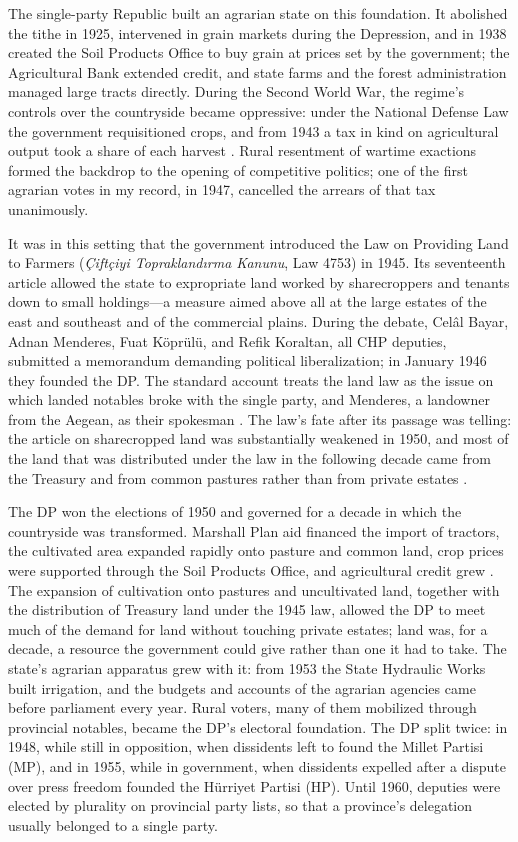 \documentclass[12pt]{article}
\begin{document}
The single-party Republic built an agrarian state on this foundation. It abolished the tithe in 1925, intervened in grain markets during the Depression, and in 1938 created the Soil Products Office to buy grain at prices set by the government; the Agricultural Bank extended credit, and state farms and the forest administration managed large tracts directly. During the Second World War, the regime's controls over the countryside became oppressive: under the National Defense Law the government requisitioned crops, and from 1943 a tax in kind on agricultural output took a share of each harvest \citep{keyder1987,zurcher2004}. Rural resentment of wartime exactions formed the backdrop to the opening of competitive politics; one of the first agrarian votes in my record, in 1947, cancelled the arrears of that tax unanimously.

It was in this setting that the government introduced the Law on Providing Land to Farmers (\textit{Çiftçiyi Topraklandırma Kanunu}, Law 4753) in 1945. Its seventeenth article allowed the state to expropriate land worked by sharecroppers and tenants down to small holdings---a measure aimed above all at the large estates of the east and southeast and of the commercial plains. During the debate, Celâl Bayar, Adnan Menderes, Fuat Köprülü, and Refik Koraltan, all CHP deputies, submitted a memorandum demanding political liberalization; in January 1946 they founded the DP. The standard account treats the land law as the issue on which landed notables broke with the single party, and Menderes, a landowner from the Aegean, as their spokesman \citep{karpat1959,keyderpamuk1984,zurcher2004}. The law's fate after its passage was telling: the article on sharecropped land was substantially weakened in 1950, and most of the land that was distributed under the law in the following decade came from the Treasury and from common pastures rather than from private estates \citep{keyder1987}.

The DP won the elections of 1950 and governed for a decade in which the countryside was transformed. Marshall Plan aid financed the import of tractors, the cultivated area expanded rapidly onto pasture and common land, crop prices were supported through the Soil Products Office, and agricultural credit grew \citep{keyder1987,ahmad1977,pamuk2018}. The expansion of cultivation onto pastures and uncultivated land, together with the distribution of Treasury land under the 1945 law, allowed the DP to meet much of the demand for land without touching private estates; land was, for a decade, a resource the government could give rather than one it had to take. The state's agrarian apparatus grew with it: from 1953 the State Hydraulic Works built irrigation, and the budgets and accounts of the agrarian agencies came before parliament every year. Rural voters, many of them mobilized through provincial notables, became the DP's electoral foundation. The DP split twice: in 1948, while still in opposition, when dissidents left to found the Millet Partisi (MP), and in 1955, while in government, when dissidents expelled after a dispute over press freedom founded the Hürriyet Partisi (HP). Until 1960, deputies were elected by plurality on provincial party lists, so that a province's delegation usually belonged to a single party.
\end{document}
